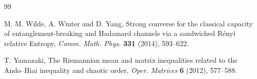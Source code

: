\documentclass[11pt,reqno]{article}
\numberwithin{equation}{section}
\begin{document}
\begin{thebibliography}{99}

M. M. Wilde, A. Winter and D. Yang,
Strong converse for the classical capacity of entanglement-breaking
and Hadamard channels via a sandwiched R\'enyi relative Entropy,
{\it Comm. Math. Phys.} {\bf 331} (2014), 593--622.

T. Yamazaki, The Riemannian mean and matrix inequalities related to the Ando--Hiai inequality
and chaotic order, {\it Oper. Matrices} {\bf 6} (2012), 577--588.

\end{thebibliography}
\end{document}
